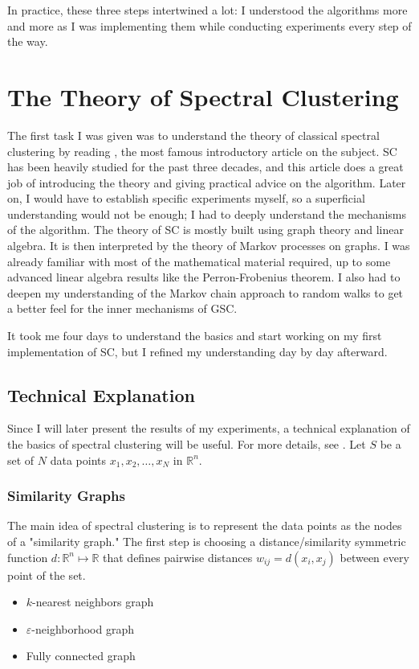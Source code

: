 \documentclass[a4paper,12pt]{article}
\theoremstyle{definition}
\theoremstyle{plain}
\def\R{\mathbb{R}}%
\begin{document}
In practice, these three steps intertwined a lot: I understood the algorithms more and more as I was implementing them while conducting experiments every step of the way.
\newpage
\section{The Theory of Spectral Clustering}
The first task I was given was to understand the theory of classical spectral clustering by reading \cite[A tutorial on Spectral Clustering]{tutorial}, the most famous introductory article on the subject. SC has been heavily studied for the past three decades, and this article does a great job of introducing the theory and giving practical advice on the algorithm. Later on, I would have to establish specific experiments myself, so a superficial understanding would not be enough; I had to deeply understand the mechanisms of the algorithm. The theory of SC is mostly built using graph theory and linear algebra. It is then interpreted by the theory of Markov processes on graphs. I was already familiar with most of the mathematical material required, up to some advanced linear algebra results like the Perron-Frobenius theorem. I also had to deepen my understanding of the Markov chain approach to random walks to get a better feel for the inner mechanisms of GSC.

It took me four days to understand the basics and start working on my first implementation of SC, but I refined my understanding day by day afterward.

\subsection{Technical Explanation} \label{sec-theory}
Since I will later present the results of my experiments, a technical explanation of the basics of spectral clustering will be useful. For more details, see \cite{tutorial}.
Let $S$ be a set of $N$ data points $x_1,x_2, \ldots ,x_N$ in $\R^n$.

\subsubsection{Similarity Graphs}
The main idea of spectral clustering is to represent the data points as the nodes of a "similarity graph." The first step is choosing a distance/similarity symmetric function $d: \R^n \mapsto \R$ that defines pairwise distances $w_{ij} = d(x_i,x_j)$ between every point of the set.
\begin{itemize}
	\item $k$-nearest neighbors graph
	\item $\varepsilon$-neighborhood graph
	\item Fully connected graph
\end{itemize}
\end{document}
